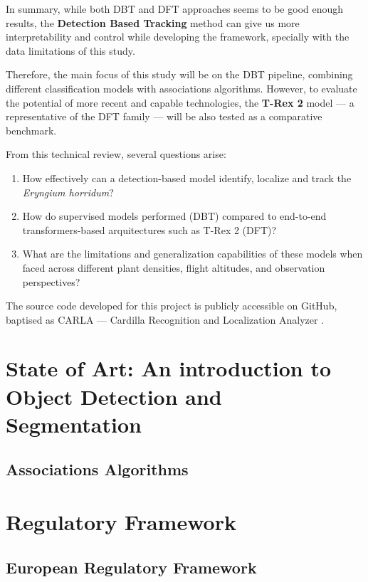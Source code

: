 \documentclass[12pt]{report} %
\begin{document}
In summary, while both DBT and DFT approaches seems to be good enough results, the \textbf{Detection Based Tracking} method can give us more interpretability and control while developing the framework, specially with the data limitations of this study.

Therefore, the main focus of this study will be on the DBT pipeline, combining different classification models with associations algorithms. However, to evaluate the potential of more recent and capable technologies, the \textbf{T-Rex 2} model \cite{Jiang2024trex2} --- a representative of the DFT family --- will be also tested as a comparative benchmark. 

From this technical review, several questions arise:

\begin{enumerate}
	\item How effectively can a detection-based model identify, localize and track the \textit{Eryngium horridum}?
	\item How do supervised models performed (DBT) compared to end-to-end transformers-based arquitectures such as T-Rex 2 (DFT)?
	\item What are the limitations and generalization capabilities of these models when faced across different plant densities, flight altitudes, and observation perspectives?
\end{enumerate}

The source code developed for this project is publicly accessible on GitHub, baptised as CARLA --- Cardilla Recognition and Localization Analyzer \cite{repoGithub}.

\section{State of Art: An introduction to Object Detection and Segmentation}

\subsection{Associations Algorithms}
\label{subsec:asoc_algorithm}

\section{Regulatory Framework}

\subsection{European Regulatory Framework}
\end{document}
